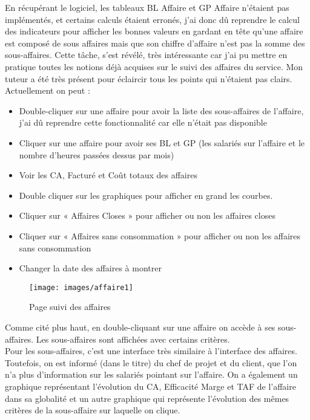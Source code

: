 En récupérant le logiciel, les tableaux BL Affaire et GP Affaire n’étaient pas implémentés, et certains calculs étaient erronés, j’ai donc dû reprendre le calcul des indicateurs pour afficher les bonnes valeurs en gardant en tête qu’une affaire est composé de sous affaires mais que son chiffre d’affaire n’est pas la somme des sous-affaires. Cette tâche, s’est révélé, très intéressante car j’ai pu mettre en pratique toutes les notions déjà acquises sur le suivi des affaires du service.  Mon tuteur a été très présent pour éclaircir tous les points qui n'étaient pas clairs.  
Actuellement on peut :
\begin{itemize}
\item Double-cliquer sur une affaire pour avoir la liste des sous-affaires de l’affaire, j’ai dû reprendre cette fonctionnalité car elle n’était pas disponible
\item Cliquer sur une affaire pour avoir ses BL et GP (les salariés sur l’affaire et le nombre d’heures passées dessus par mois)
\item Voir les CA, Facturé et Coût totaux des affaires
\item Double cliquer sur les graphiques pour afficher en grand les courbes.
\item Cliquer sur « Affaires Closes » pour afficher ou non les affaires closes
\item Cliquer sur « Affaires sans consommation » pour afficher ou non les affaires sans consommation
\item Changer la date des affaires à montrer\\
\end{itemize}

\begin{figure}[!h]
\center
\texttt{[image: images/affaire1]}
\caption{Page suivi des affaires}
\end{figure}

Comme cité plus haut, en double-cliquant sur une affaire on accède à ses sous-affaires. Les sous-affaires sont affichées avec certains critères.\\

Pour les sous-affaires, c’est une interface très similaire à l’interface des affaires. Toutefois, on est informé (dans le titre) du chef de projet et du client, que l’on n’a plus d’information sur les salariés pointant sur l’affaire. On a également un graphique représentant l’évolution du CA, Efficacité Marge et TAF de l’affaire dans sa globalité et un autre graphique qui représente l’évolution des mêmes critères de la sous-affaire sur laquelle on clique.\\


